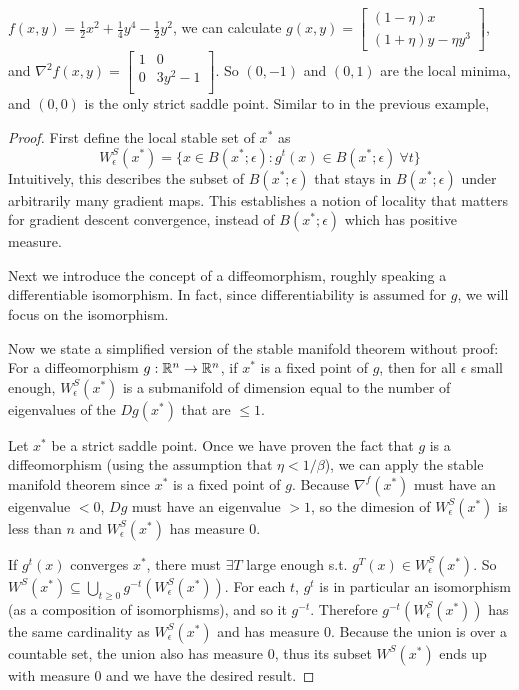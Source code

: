 \begin{example}
$f(x,y) = \frac{1}{2}x^2 + \frac{1}{4}y^4 - \frac{1}{2}y^2$, 
we can calculate
$g(x,y) = 
\begin{bmatrix}
(1-\eta)x\\
(1+\eta)y - \eta y^3 
\end{bmatrix}
$, and
$\nabla^2 f(x,y) = 
 \begin{bmatrix}
1 & 0 \\
0 & 3y^2-1 \\
\end{bmatrix}
$.
So $(0,-1)$ and $(0,1)$ are the local minima, and $(0,0)$ is the only strict saddle point. Similar to in the previous example, 

\begin{proof}
First define the local stable set of $x^*$ as
$$
W^S_\epsilon(x^*) 
= \{ x\in B(x^*;\epsilon): g^t(x)\in B(x^*;\epsilon) ~\forall t \}
$$
Intuitively, this describes the subset of $B(x^*;\epsilon)$ that stays in $B(x^*;\epsilon)$ under arbitrarily many gradient maps. This establishes a notion of locality that matters for gradient descent convergence, instead of $B(x^*;\epsilon)$ which has positive measure.

\noindent
Next we introduce the concept of a diffeomorphism, roughly speaking a differentiable isomorphism. In fact, since differentiability is assumed for $g$, we will focus on the isomorphism.

\noindent
Now we state a simplified version of the stable manifold theorem without proof: For a diffeomorphism $g:\mathbb{R}^n\rightarrow\mathbb{R}^n$, if $x^*$ is a fixed point of $g$, then for all $\epsilon$ small enough, $W^S_\epsilon(x^*)$ is a submanifold of dimension equal to the number of eigenvalues of the $Dg(x^*)$ that are $\leq 1$.

\noindent
Let $x^*$ be a strict saddle point.
Once we have proven the fact that $g$ is a diffeomorphism (using the assumption that $\eta<1/\beta$), we can apply the stable manifold theorem since $x^*$ is a fixed point of $g$. 
Because $\nabla^f (x^*)$ must have an eigenvalue $<0$, $Dg$ must have an eigenvalue $>1$, so 
the dimesion of $W^S_\epsilon(x^*)$ is less than $n$ and $W^S_\epsilon(x^*)$ has measure 0. 

\noindent
If $g^t(x)$ converges $x^*$, there must $\exists T$ large enough s.t. $g^T(x)\in W_\epsilon^S(x^*)$. 
So $W^S(x^*)\subseteq \bigcup_{t\geq 0 }g^{-t}(W_\epsilon^S(x^*))$.
For each $t$, $g^t$ is in particular an isomorphism (as a composition of isomorphisms), and so it $g^{-t}$.
Therefore $g^{-t}(W_\epsilon^S(x^*))$ has the same cardinality as 
$W_\epsilon^S(x^*)$ and has measure 0. Because the union is over a countable set, the union also has measure 0, thus its subset $W^S(x^*)$ ends up with measure 0 and we have the desired result.


\end{proof}
\end{example}
